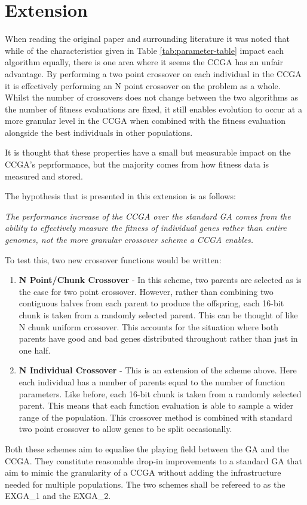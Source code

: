 \section{Extension} \label{sec:extension}

When reading the original paper and surrounding literature it was noted that while of the characteristics given in Table \ref{tab:parameter-table} impact each algorithm equally, there is one area where it seems the CCGA has an unfair advantage.
By performing a two point crossover on each individual in the CCGA it is effectively performing an N point crossover on the problem as a whole. 
Whilst the number of crossovers does not change between the two algorithms as the number of fitness evaluations are fixed, it still enables evolution to occur at a more granular level in the CCGA when combined with the fitness evaluation alongside the best individuals in other populations.

It is thought that these properties have a small but measurable impact on the CCGA's peprformance, but the majority comes from how fitness data is measured and stored.


The hypothesis that is presented in this extension is as follows:

\emph{The performance increase of the CCGA over the standard GA comes from the ability to effectively measure the fitness of individual genes rather than entire genomes, not the more granular crossover scheme a CCGA enables.} 

To test this, two new crossover functions would be written:
\begin{enumerate}
    \item \textbf{N Point/Chunk Crossover} - In this scheme, two parents are selected as is the case for two point crossover. However, rather than combining two contiguous halves from each parent to produce the offspring, each 16-bit chunk is taken from a randomly selected parent. 
    This can be thought of like N chunk uniform crossover.
    This accounts for the situation where both parents have good and bad genes distributed throughout rather than just in one half.

    \item \textbf{N Individual Crossover} -  This is an extension of the scheme above.
    Here each individual has a number of parents equal to the number of function parameters.
    Like before, each 16-bit chunk is taken from a randomly selected parent.
    This means that each function evaluation is able to sample a wider range of the population.
    This crossover method is combined with standard two point crossover to allow genes to be split occasionally.
\end{enumerate}

Both these schemes aim to equalise the playing field between the GA and the CCGA. 
They constitute reasonable drop-in improvements to a standard GA that aim to mimic the granularity of a CCGA without adding the infrastructure needed for multiple populations.
The two schemes shall be refereed to as the EXGA\_1 and the EXGA\_2.
